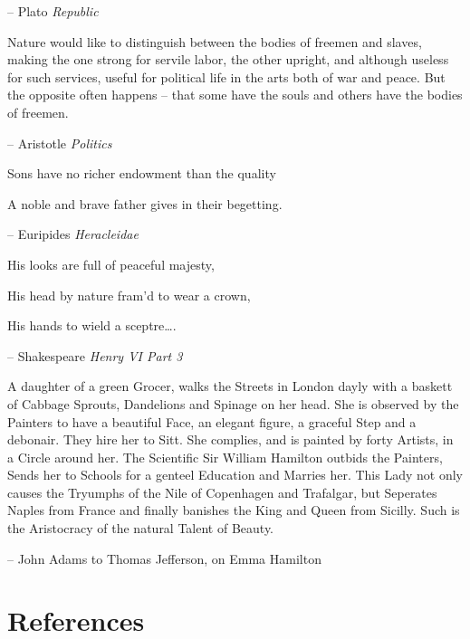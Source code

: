 \documentclass[
]{article}
\begin{document}
-- Plato \emph{Republic}

Nature would like to distinguish between the bodies of freemen and
slaves, making the one strong for servile labor, the other upright, and
although useless for such services, useful for political life in the
arts both of war and peace. But the opposite often happens -- that some
have the souls and others have the bodies of freemen.

-- Aristotle \emph{Politics}

Sons have no richer endowment than the quality

A noble and brave father gives in their begetting.

-- Euripides \emph{Heracleidae}

His looks are full of peaceful majesty,

His head by nature fram'd to wear a crown,

His hands to wield a sceptre\ldots.

-- Shakespeare \emph{Henry VI Part 3}

A daughter of a green Grocer, walks the Streets in London dayly with a
baskett of Cabbage Sprouts, Dandelions and Spinage on her head. She is
observed by the Painters to have a beautiful Face, an elegant figure, a
graceful Step and a debonair. They hire her to Sitt. She complies, and
is painted by forty Artists, in a Circle around her. The Scientific Sir
William Hamilton outbids the Painters, Sends her to Schools for a
genteel Education and Marries her. This Lady not only causes the
Tryumphs of the Nile of Copenhagen and Trafalgar, but Seperates Naples
from France and finally banishes the King and Queen from Sicilly. Such
is the Aristocracy of the natural Talent of Beauty.

-- John Adams to Thomas Jefferson, on Emma Hamilton

\newpage

\hypertarget{references}{%
\section*{References}\label{references}}
\end{document}
